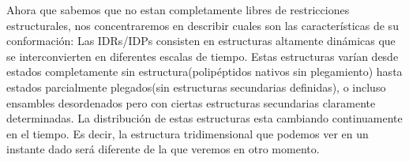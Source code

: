 
Ahora que sabemos que no estan completamente libres de restricciones estructurales, nos concentraremos en describir cuales son las características de su conformación:
Las IDRs/IDPs consisten en estructuras altamente dinámicas que se interconvierten en diferentes escalas de tiempo.
Estas estructuras varían desde estados completamente sin estructura(polipéptidos nativos sin plegamiento) hasta estados parcialmente plegados(sin estructuras secundarias definidas), o incluso ensambles desordenados pero con ciertas
estructuras secundarias claramente determinadas.
La distribución de estas estructuras esta cambiando continuamente en el tiempo. 
Es decir, la estructura tridimensional que podemos ver en un instante dado será diferente de la que veremos en otro momento.


